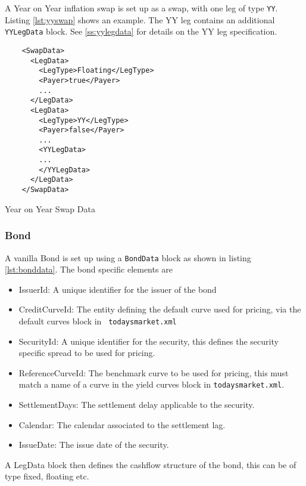 A Year on Year inflation swap is set up as a swap, with one leg of type {\tt YY}. Listing \ref{lst:yyswap} shows an
example. The YY leg contains an additional {\tt YYLegData} block. See \ref{ss:yylegdata} for details on the YY leg
specification.

\begin{listing}[H]
\begin{verbatim}
    <SwapData>
      <LegData>
        <LegType>Floating</LegType>
        <Payer>true</Payer>
        ...
      </LegData>
      <LegData>
        <LegType>YY</LegType>
        <Payer>false</Payer>
        ...
        <YYLegData>
        ...
        </YYLegData>
      </LegData>
    </SwapData>
\end{verbatim}
\caption{Year on Year Swap Data}
\label{lst:yyswap}
\end{listing}

\subsubsection{Bond}

A vanilla Bond is set up using a {\tt BondData} block as shown in listing \ref{lst:bonddata}. The bond specific elements
are

\begin{itemize}
\item IssuerId: A unique identifier for the issuer of the bond
\item CreditCurveId: The entity defining the default curve used for pricing, via the default curves block in {\tt
    todaysmarket.xml}
\item SecurityId: A unique identifier for the security, this defines the security specific spread to be used for
  pricing.
\item ReferenceCurveId: The benchmark curve to be used for pricing, this must match a name of a curve in the yield
  curves block in {\tt todaysmarket.xml}.
\item SettlementDays: The settlement delay applicable to the security.
\item Calendar: The calendar associated to the settlement lag.
\item IssueDate: The issue date of the security.
\end{itemize}

A LegData block then defines the cashflow structure of the bond, this can be of type fixed, floating etc.

